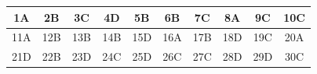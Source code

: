 \begin{center}
\renewcommand{\arraystretch}{1.3}
\begin{tabular}{|c|c|c|c|c|c|c|c|c|c|}
\hline
1A & 2B & 3C & 4D & 5B & 6B & 7C & 8A & 9C & 10C \\
\hline
11A & 12B & 13B & 14B & 15D & 16A & 17B & 18D & 19C & 20A \\
\hline
21D & 22B & 23D & 24C & 25D & 26C & 27C & 28D & 29D & 30C \\
\hline
\end{tabular}
\end{center}













